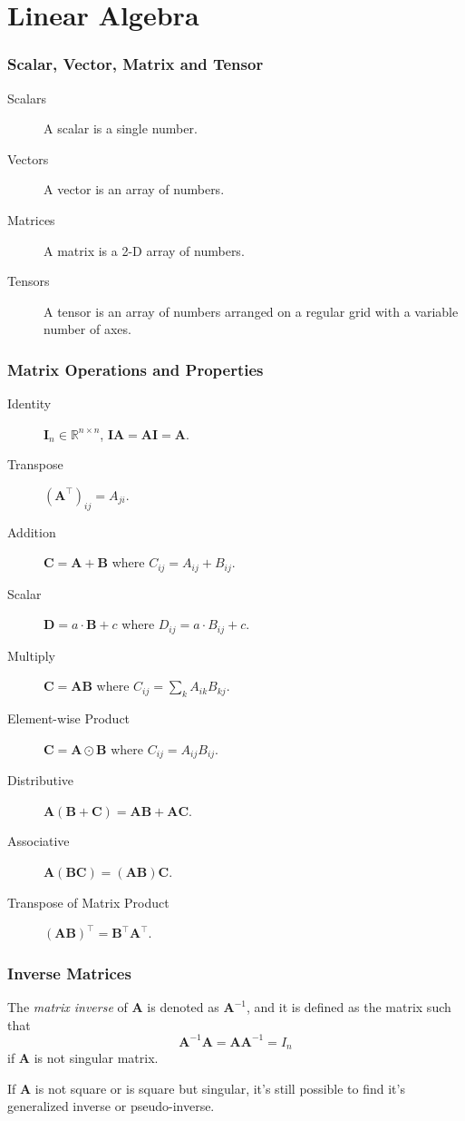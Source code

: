 \documentclass{beamer}
\begin{document}
\section{Linear Algebra}

\begin{frame}
  \frametitle{Scalar, Vector, Matrix and Tensor}

  \begin{description}
    \item[Scalars] A scalar is a single number.
    \item[Vectors] A vector is an array of numbers.
    \item[Matrices] A matrix is a 2-D array of numbers.
    \item[Tensors] A tensor is an array of numbers arranged on a regular grid with a variable number of axes.
  \end{description}
\end{frame}

\begin{frame}
    \frametitle{Matrix Operations and Properties}

    \begin{description}
      \item[Identity] $\bm{I}_{n}\in\mathbb{R}^{n\times n}$, $\bm{I}\bm{A}=\bm{A}\bm{I}=\bm{A}$.
      \item[Transpose] $(\bm{A}^{\top})_{ij}=A_{ji}$.
      \item[Addition] $\bm{C}=\bm{A}+\bm{B}$ where $C_{ij}=A_{ij}+B_{ij}$.
      \item[Scalar] $\bm{D}=a\cdot\bm{B}+c$ where $D_{ij}=a\cdot B_{ij}+c$.
      \item[Multiply] $\bm{C}=\bm{A}\bm{B}$ where $C_{ij}=\sum_{k}A_{ik}B_{kj}$.
      \item[Element-wise Product] $\bm{C}=\bm{A}\odot\bm{B}$ where $C_{ij}=A_{ij}B_{ij}$.
      \item[Distributive] $\bm{A}(\bm{B}+\bm{C})=\bm{A}\bm{B}+\bm{A}\bm{C}$.
      \item[Associative] $\bm{A}(\bm{B}\bm{C})=(\bm{A}\bm{B})\bm{C}$.
      \item[Transpose of Matrix Product] $(\bm{A}\bm{B})^{\top}=\bm{B}^{\top}\bm{A}^{\top}$.
    \end{description}
\end{frame}

\begin{frame}
  \frametitle{Inverse Matrices}

  The \emph{matrix inverse} of $\bm{A}$ is denoted as $\bm{A}^{-1}$, and it is defined as the matrix such that
  \begin{equation*}
    \bm{A}^{-1}\bm{A}=\bm{A}\bm{A}^{-1}=I_{n}
  \end{equation*}
  if $\bm{A}$ is not singular matrix.

  If $\bm{A}$ is not square or is square but singular, it's still possible to find it's generalized inverse or pseudo-inverse.
\end{frame}
\end{document}
